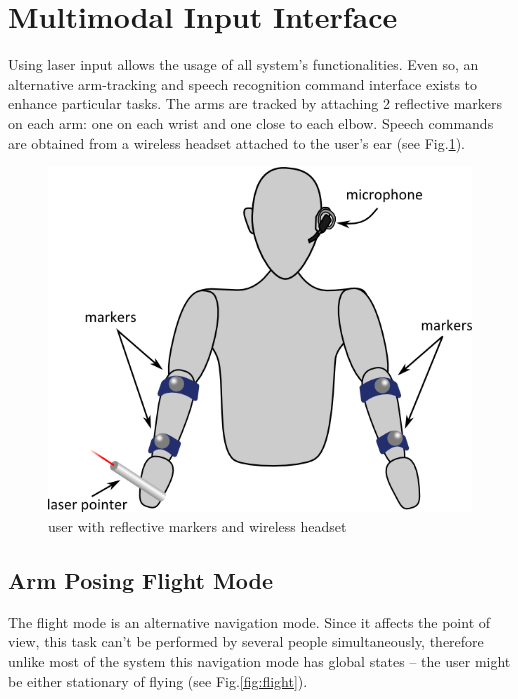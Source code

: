 \section{Multimodal Input Interface}

Using laser input allows the usage of all system's functionalities.
Even so, an alternative arm-tracking and speech recognition command interface exists to enhance particular tasks.
The arms are tracked by attaching 2 reflective markers on each arm: one on each wrist and one close to each elbow.
Speech commands are obtained from a wireless headset attached to the user's ear (see Fig.\ref{fig:markers2}).


\begin{figure}[ht]
	\centering
		\includegraphics[scale=1.3]{gfx/markers2.png}
	\caption{user with reflective markers and wireless headset}
	\label{fig:markers2}
\end{figure}



\subsection{Arm Posing Flight Mode}

The flight mode is an alternative navigation mode. Since it affects the point of view, this task can't be performed by
several people simultaneously, therefore unlike most of the system this navigation mode has global states
-- the user might be either stationary of flying (see Fig.\ref{fig:flight}).

